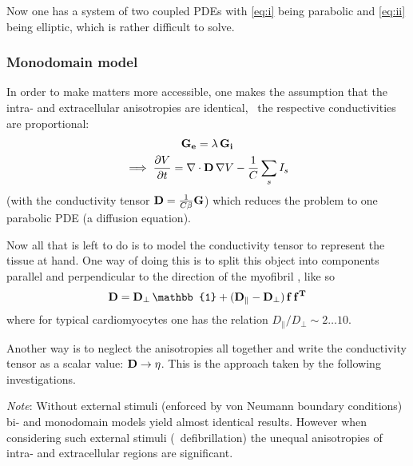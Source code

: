 Now one has a system of two coupled PDEs with \eqref{eq:i} being parabolic
and \eqref{eq:ii} being elliptic, which is rather difficult to solve.

\subsubsection{Monodomain model}
In order to make matters more accessible, one makes the assumption that the
intra- and extracellular anisotropies are identical, \ie~the respective
conductivities are proportional:
\begin{gather}
    \mathbf{G_e}=\lambda\,\mathbf{G_i} \nonumber \\ \implies
    \pdv{V}{t}=\nabla\cdot\mathbf{D}\,\nabla{V}-\frac{1}{C}\sum_{s}I_{s}
    \label{eq:divcap}
\end{gather}
(with the conductivity tensor $\mathbf{D}=\frac{1}{C\beta}\mathbf{G}$)
which reduces the problem to one parabolic PDE (a diffusion equation).

Now all that is left to do is to model the conductivity tensor  to
represent the tissue at hand.
One way of doing this is to split this object
into components parallel and perpendicular to the direction of the
myofibril , like so
\begin{equation*}
    \myten{D}=\myten{D_{\perp}}\,\mathbb{1}+(\myten{D_{\parallel}}
    -\myten{D_{\perp}})\,\myvec{f}\,\myvec{f^T}
\end{equation*}
where for typical cardiomyocytes one has the relation
$D_{\parallel}/D_{\perp}\sim2\ldots10$.

Another way is to neglect the anisotropies all together and write the
conductivity tensor as a scalar value: $\mathbf{D}\to\eta$. This is the
approach taken by the following investigations.

\vspace{\baselineskip}
\emph{Note}: Without external stimuli (enforced by von Neumann boundary
conditions) bi- and monodomain models yield almost identical results.
However when considering such external stimuli (\eg~defibrillation) the
unequal anisotropies of intra- and extracellular regions are significant.


